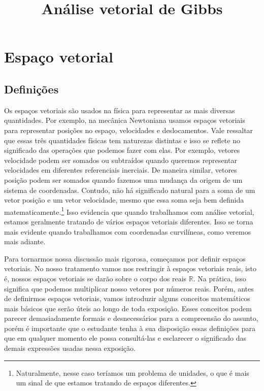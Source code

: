 \newif\ifuseseminar
\useseminarfalse


\title{Análise vetorial de Gibbs}


\section{Espaço vetorial}

\subsection{Definições}

Os espaços vetoriais são usados na física para representar as mais diversas
quantidades. Por exemplo, na mecânica Newtoniana usamos espaços vetoriais para
representar posições no espaço, velocidades e deslocamentos. Vale ressaltar que
essas três quantidades físicas tem naturezas distintas e isso se reflete no
significado das operações que podemos fazer com elas. Por exemplo, vetores
velocidade podem ser somados ou subtraídos quando queremos representar
velocidades em diferentes referenciais inerciais. De maneira similar, vetores
posição podem ser somados quando fazemos uma mudança da origem de um sistema de
coordenadas. Contudo, não há significado natural para a soma de um vetor posição
e um vetor velocidade, mesmo que essa soma seja bem definida
matematicamente.\footnote{Naturalmente, nesse caso teríamos um problema de
	unidades, o que é mais um sinal de que estamos tratando de espaços diferentes.}
Isso evidencia que quando trabalhamos com análise vetorial, estamos geralmente
tratando de vários espaços vetoriais diferentes. Isso se torna mais evidente
quando trabalhamos com coordenadas curvilíneas, como veremos mais adiante.

Para tornarmos nossa discussão mais rigorosa, começamos por definir espaços
vetoriais. No nosso tratamento vamos nos restringir à espaços vetoriais reais,
isto é, nossos espaços vetoriais se darão sobre o corpo dos reais $\mathbb{R}$.
Na prática, isso significa que podemos multiplicar nosso vetores por números
reais. Porém, antes de definirmos espaços vetoriais, vamos introduzir alguns
conceitos matemáticos mais básicos que serão úteis ao longo de toda exposição.
Esses conceitos podem parecer demasiadamente formais e desnecessários para a
compreensão do assunto, porém é importante que o estudante tenha à sua
disposição essas definições para que em qualquer momento ele possa consultá-las
e esclarecer o significado das demais expressões usadas nessa exposição.

